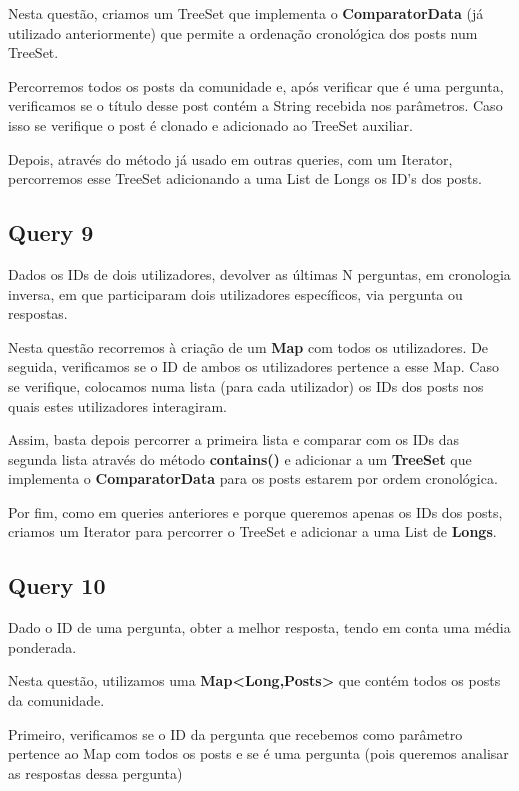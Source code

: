 \documentclass[a4paper]{article}
\begin{document}
Nesta questão, criamos um TreeSet que implementa o \textbf{ComparatorData} (já
utilizado anteriormente) que permite a ordenação cronológica dos posts num TreeSet.

Percorremos todos os posts da comunidade e, após verificar que é uma pergunta,
verificamos se o título desse post contém a String recebida nos parâmetros. Caso 
isso se verifique o post é clonado e adicionado ao TreeSet auxiliar.

Depois, através do método já usado em outras queries, com um Iterator, percorremos
esse TreeSet adicionando a uma List de Longs os ID's dos posts.

\subsection{Query 9}

Dados os IDs de dois utilizadores, devolver as últimas N perguntas, em
cronologia inversa, em que participaram dois utilizadores específicos, 
via pergunta ou respostas.

Nesta questão recorremos à criação de um \textbf{Map} com todos os utilizadores. De seguida, verificamos se o ID de ambos os utilizadores pertence a esse Map.
Caso se verifique, colocamos numa lista (para cada utilizador) os IDs dos posts nos quais estes utilizadores interagiram.

Assim, basta depois percorrer a primeira lista e comparar com os IDs das segunda lista através do método \textbf{contains()} e adicionar a um \textbf{TreeSet} que implementa o \textbf{ComparatorData} para os posts estarem por ordem cronológica.

Por fim, como em queries anteriores e porque queremos apenas os IDs dos posts, criamos um Iterator para percorrer o TreeSet e adicionar a uma List de \textbf{Longs}.



\subsection{Query 10}


Dado o ID de uma pergunta, obter a melhor resposta, tendo em conta
uma média ponderada.

Nesta questão, utilizamos uma \textbf{Map<Long,Posts>} que contém todos os posts da comunidade.

Primeiro, verificamos se o ID da pergunta que recebemos como parâmetro pertence ao Map com todos os posts e se é uma pergunta (pois queremos analisar as respostas dessa pergunta)
\end{document}
